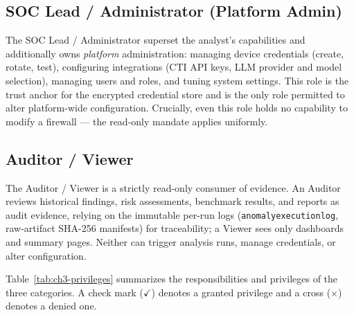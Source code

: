 \documentclass[12pt,a4paper]{report}
\renewcommand{\_}{\textunderscore\allowbreak}
\begin{document}
\subsection{SOC Lead / Administrator (Platform Admin)}
\label{sec:ch3-user-admin}
The SOC Lead / Administrator superset the analyst's capabilities and additionally owns \emph{platform} administration: managing device credentials (create, rotate, test), configuring integrations (CTI API keys, LLM provider and model selection), managing users and roles, and tuning system settings. This role is the trust anchor for the encrypted credential store and is the only role permitted to alter platform-wide configuration. Crucially, even this role holds no capability to modify a firewall — the read-only mandate applies uniformly.

\subsection{Auditor / Viewer}
\label{sec:ch3-user-auditor}
The Auditor / Viewer is a strictly read-only consumer of evidence. An Auditor reviews historical findings, risk assessments, benchmark results, and reports as audit evidence, relying on the immutable per-run logs (\texttt{anomaly\_execution\_log}, raw-artifact SHA-256 manifests) for traceability; a Viewer sees only dashboards and summary pages. Neither can trigger analysis runs, manage credentials, or alter configuration.

Table~\ref{tab:ch3-privileges} summarizes the responsibilities and privileges of the three categories. A check mark ($\checkmark$) denotes a granted privilege and a cross ($\times$) denotes a denied one.
\end{document}
